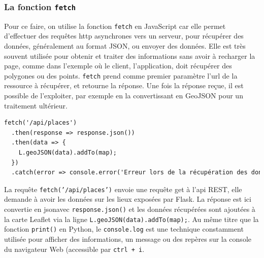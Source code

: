 \subsubsection{La fonction \texttt{fetch}}
Pour ce faire, on utilise la fonction \texttt{fetch} en JavaScript car elle permet d'effectuer des requêtes \acrshort{http} asynchrones vers un serveur, pour récupérer des données, généralement au format JSON, ou envoyer des données. Elle est très souvent utilisée pour obtenir et traiter des informations sans avoir à recharger la page, comme dans l'exemple où le client, l'application, doit récupérer des polygones ou des points. \texttt{fetch} prend comme premier paramètre l'\acrshort{url} de la ressource à récupérer, et retourne la réponse. Une fois la réponse reçue, il est possible de l'exploiter, par exemple en la convertissant en GeoJSON pour un traitement ultérieur. 
\begin{lstlisting}[language=HTML, caption=Exemple d'utilisation de la fonction fetch]
fetch('/api/places')
  .then(response => response.json()) 
  .then(data => {
    L.geoJSON(data).addTo(map); 
  })
  .catch(error => console.error('Erreur lors de la récupération des données:', error));
\end{lstlisting}

La requête \texttt{fetch('/api/places')} envoie une requête \acrshort{get} à l'\acrshort{api} REST, elle demande à avoir les données sur les lieux exposées par Flask. La réponse est ici convertie en \acrshort{json}avec \texttt{response.json()} et les données récupérées sont ajoutées à la carte Leaflet via la ligne \texttt{L.geoJSON(data).addTo(map);}. Au même titre que la fonction \texttt{print()} en Python, le \texttt{console.log} est une technique constamment utilisée pour afficher des informations, un message ou des repères sur la console du navigateur Web (accessible par \texttt{ctrl + i}.

